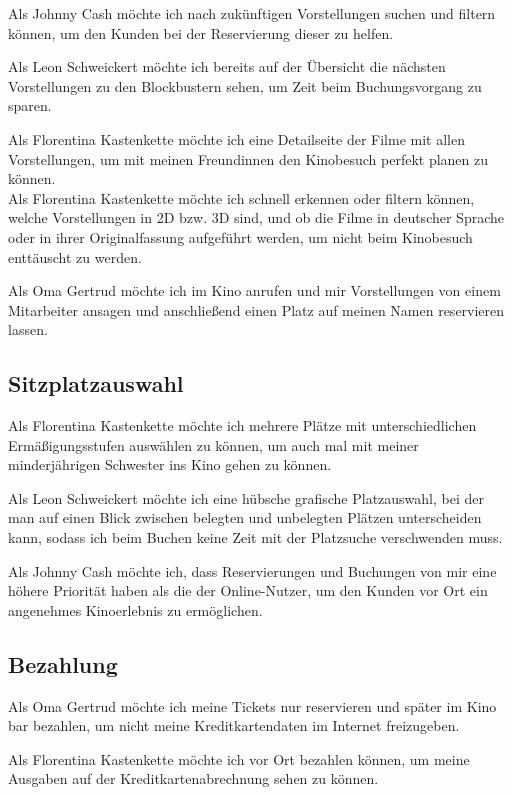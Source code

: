 Als Johnny Cash möchte ich nach zukünftigen Vorstellungen suchen und filtern können, um den Kunden bei der Reservierung dieser zu helfen.

Als Leon Schweickert möchte ich bereits auf der Übersicht die nächsten Vorstellungen zu den Blockbustern sehen, um Zeit beim Buchungsvorgang zu sparen.

Als Florentina Kastenkette möchte ich eine Detailseite der Filme mit allen Vorstellungen, um mit meinen Freundinnen den Kinobesuch perfekt planen zu können. \\
Als Florentina Kastenkette möchte ich schnell erkennen oder filtern können, welche Vorstellungen in 2D bzw. 3D sind, und ob die Filme in deutscher Sprache oder in ihrer Originalfassung aufgeführt werden, um nicht beim Kinobesuch enttäuscht zu werden.

Als Oma Gertrud möchte ich im Kino anrufen und mir Vorstellungen von einem Mitarbeiter ansagen und anschließend einen Platz auf meinen Namen reservieren lassen.

\subsection{Sitzplatzauswahl}
Als Florentina Kastenkette möchte ich mehrere Plätze mit unterschiedlichen Ermäßigungsstufen auswählen zu können, um auch mal mit meiner minderjährigen Schwester ins Kino gehen zu können.

Als Leon Schweickert möchte ich eine hübsche grafische Platzauswahl, bei der man auf einen Blick zwischen belegten und unbelegten Plätzen unterscheiden kann, sodass ich beim Buchen keine Zeit mit der Platzsuche verschwenden muss.

Als Johnny Cash möchte ich, dass Reservierungen und Buchungen von mir eine höhere Priorität haben als die der Online-Nutzer, um den Kunden vor Ort ein angenehmes Kinoerlebnis zu ermöglichen.

\subsection{Bezahlung}
Als Oma Gertrud möchte ich meine Tickets nur reservieren und später im Kino bar bezahlen, um nicht meine Kreditkartendaten im Internet freizugeben.

Als Florentina Kastenkette möchte ich vor Ort bezahlen können, um meine Ausgaben auf der Kreditkartenabrechnung sehen zu können.

